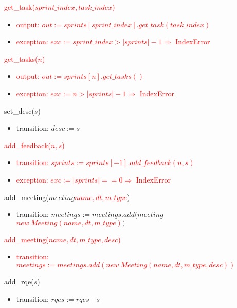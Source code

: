 \documentclass[12pt, titlepage]{article}
\begin{document}
\noindent \textcolor{red}{get\_task($sprint\_index, task\_index$)}
\begin{itemize}
    \item \textcolor{red}{output: $out := sprints[sprint\_index].get\_task(task\_index)$}
    \item \textcolor{red}{exception: $exc := sprint\_index > |sprints| - 1 \Rightarrow$ IndexError}
\end{itemize}

\noindent \textcolor{red}{get\_tasks($n$)}
\begin{itemize}
    \item \textcolor{red}{output: $out := sprints[n].get\_tasks()$}
    \item \textcolor{red}{exception: $exc := n > |sprints| - 1 \Rightarrow$ IndexError}
\end{itemize}

\noindent set\_desc($s$)
\begin{itemize}
    \item transition: $desc := s$
\end{itemize}

\noindent \textcolor{red}{add\_feedback($n,s$)}
\begin{itemize}
    \item \textcolor{red}{transition: $sprints := sprints[-1].add\_feedback(n,s)$}
    \item \textcolor{red}{exception: $exc := |sprints| == 0 \Rightarrow$ IndexError}
\end{itemize}

\noindent add\_meeting(\sout{$meeting$}\textcolor{red}{$name, dt, m\_type$})
\begin{itemize}
    \item transition: $meetings := meetings.add($\sout{$meeting$}\textcolor{red}{$new \ Meeting(name, dt, m\_type)$}$)$
\end{itemize}

\noindent \textcolor{red}{add\_meeting($name, dt, m\_type, desc$)}
\begin{itemize}
    \item \textcolor{red}{transition: $meetings := meetings.add(new \ Meeting(name, dt, m\_type, desc))$}
\end{itemize}

\noindent add\_rqe($s$)
\begin{itemize}
    \item transition: $rqes := rqes\ ||\ s$
\end{itemize}
\end{document}
